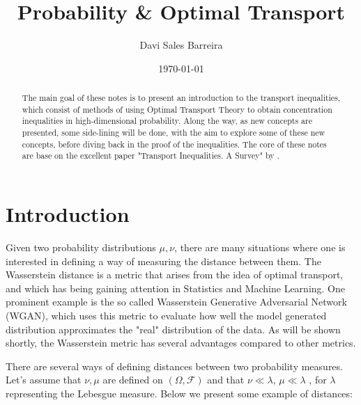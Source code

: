 \documentclass[10pt]{article}
\title{Probability \& Optimal Transport}
\author{Davi Sales Barreira}
\date{\today}
\theoremstyle{definition}
\begin{document}
\maketitle \tableofcontents 


\begin{abstract}
The main goal of these notes is to present an introduction to the transport inequalities,
which consist of methods of using Optimal Transport Theory to obtain concentration
inequalities in high-dimensional probability. Along the way, as new concepts are presented,
some side-lining will be done, with the aim to explore some of these new concepts, before
diving back in the proof of the inequalities. The core of these notes are base on the
excellent paper "Transport Inequalities. A Survey" by \cite{gozlan2010transport}.
\end{abstract}


\section{Introduction}
Given two probability distributions $\mu,\nu$, there are many situations
where one is interested in defining a way of measuring the
distance between them. The Wasserstein distance is a
metric that arises from the idea of optimal transport, and which has being
gaining attention in Statistics and Machine Learning. One prominent example is the so
called Wasserstein Generative Adversarial Network (WGAN), which uses this metric to evaluate
how well the model generated distribution approximates the "real" distribution of the
data. As will be shown shortly, the Wasserstein metric has several advantages compared to
other metrics.

There are several ways of defining distances between two
probability measures. Let's assume that $\nu, \mu$ are defined on 
$(\Omega, \mathcal F)$ and that $\nu \ll \lambda$,
$\mu \ll \lambda$ , for $\lambda$ representing the Lebesgue measure. Below
we present some example of distances:
\end{document}
